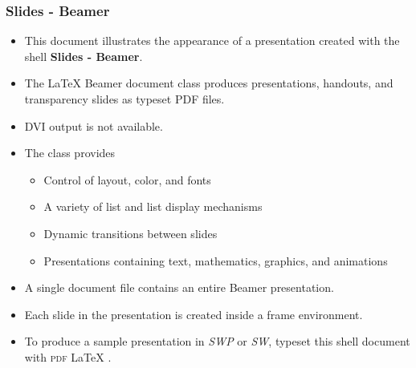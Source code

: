 \documentclass[notes=show]{beamer}%
\begin{document}
\begin{frame}%
%

\frametitle{Slides - Beamer}%


\begin{itemize}
\item This document illustrates the appearance of a presentation created with
the shell \textbf{Slides - Beamer}.

\item The
\LaTeX{}
Beamer document class produces presentations, handouts, and transparency
slides as typeset PDF files.

\item DVI output is not available.

\item The class provides

\begin{itemize}
\item Control of layout, color, and fonts

\item A variety of list and list display mechanisms

\item Dynamic transitions between slides

\item Presentations containing text, mathematics, graphics, and animations
\end{itemize}

\item A single document file contains an entire Beamer presentation.

\item Each slide in the presentation is created inside a frame environment.

\item To produce a sample presentation in \textsl{SWP }or \textsl{SW}, typeset
this shell document with \textsc{pdf}%
\LaTeX{}
.
\end{itemize}%

\end{frame}%
\end{document}
